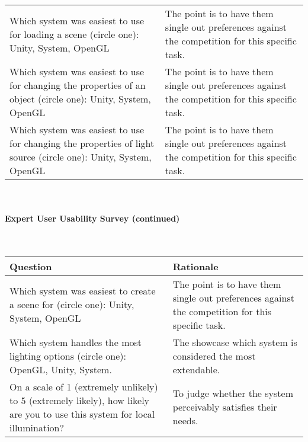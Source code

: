 \documentclass[12pt, titlepage]{article}
\begin{document}
\begin{tabular}{p{8cm}|p{8cm}}
	Which system was easiest to use for loading a scene (circle one): Unity, 
	System, OpenGL & The point is to have them single out preferences against 
	the competition for this specific task.\\
	Which system was easiest to use for changing the properties of an object 
	(circle one): Unity, System, OpenGL & The point is to have them single out 
	preferences against the competition for this specific task.\\	
	Which system was easiest to use for changing the properties of light source 
	(circle one): Unity, System, OpenGL & The point is to have them single out 
	preferences against the competition for this specific task.\\		
	\hline
\end{tabular}

~\newline
\paragraph{Expert User Usability Survey (continued)}
~\newline
\begin{tabular}{p{8cm}|p{8cm}}
	\hline
	\textbf{Question} & \textbf{Rationale} \\
	\hline
	Which system was easiest to create a scene for (circle one): Unity, System, 
	OpenGL & The point is to have them single out preferences against the 
	competition for this specific task.\\	
	Which system handles the most lighting options (circle one): OpenGL, Unity, 
	System. & The showcase which system is considered the most extendable. \\
	On a scale of 1 (extremely unlikely) to 5 (extremely likely), how 
	likely are you to use this system for local illumination? & To judge 
	whether the system perceivably satisfies their needs. \\
	\hline
\end{tabular}

\end{document}
